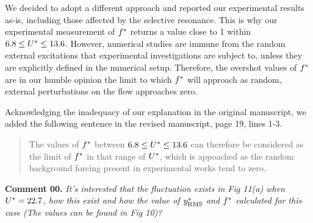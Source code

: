 \documentclass[10pt]{article}
\newcounter{question}
\newcommand{\name}{00}
\newcommand{\question}[1]{\refstepcounter{question} \noindent \textbf{Comment \name.\thequestion}\vskip 0.25cm \noindent \emph{#1}\\}
\begin{document}
{  We decided to adopt a different approach and reported our experimental results as-is, including those affected by the selective resonance. This is why our experimental measurement of $f^{*}$ returns a value close to 1 within $6.8 \leq U^{*} \leq 13.6$. However, numerical studies are immune from the random external excitations that experimental investigations are subject to, unless they are explicitly defined in the numerical setup. Therefore, the overshot values of $f^{*}$ are in our humble opinion the limit to which $f^{*}$ will approach as random, external perturbations on the flow approaches zero.

  Acknowledging the inadequacy of our explanation in the original manuscript, we added the following sentence in the revised manuscript, page 19, lines 1-3.

  \begin{quotation}
    \color{blue}
    \noindent The values of $f^{*}$ between $6.8 \leq U^{*} \leq 13.6$ can therefore be considered as the limit of $f^{*}$ in that range of $U^{*}$, which is appoached as the random background forcing present in experimental works tend to zero.
    \color{black}
  \end{quotation}

}

\question{It's interested that the fluctuation exists in Fig 11(a) when $U^{*} = 22.7$, how this exist and how the value of $y^{*}_{\text{RMS}}$ and $f^{*}$ calculated for this case (The values can be found in Fig 10)?}
\end{document}
